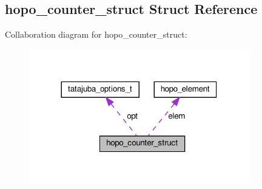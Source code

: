 \hypertarget{structhopo__counter__struct}{}\subsection{hopo\+\_\+counter\+\_\+struct Struct Reference}
\label{structhopo__counter__struct}


Collaboration diagram for hopo\+\_\+counter\+\_\+struct\+:\nopagebreak
\begin{figure}[H]
\begin{center}
\leavevmode
\includegraphics[width=272pt]{structhopo__counter__struct__coll__graph}
\end{center}
\end{figure}
